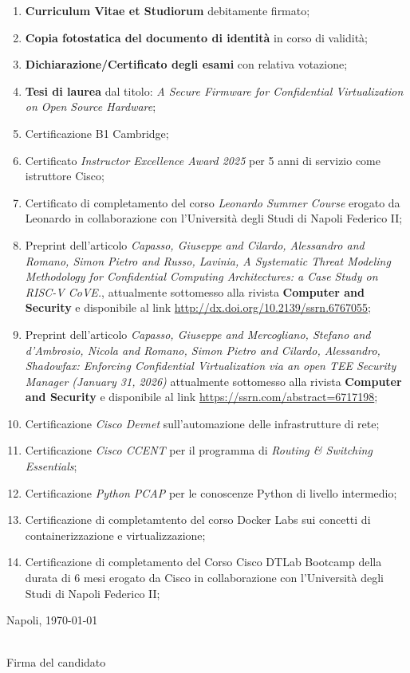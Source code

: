 \documentclass[11pt,a4paper]{article}
\begin{document}
\begin{enumerate}[label=\textbf{\arabic*.}]
    \item \textbf{Curriculum Vitae et Studiorum} debitamente firmato;
    \item \textbf{Copia fotostatica del documento di identità} in corso di validità;
    \item \textbf{Dichiarazione/Certificato degli esami} con relativa votazione;
    \item \textbf{Tesi di laurea} dal titolo: \textit{A Secure Firmware for Confidential Virtualization on Open Source Hardware};
    \item Certificazione B1 Cambridge;
    \item Certificato \textit{Instructor Excellence Award 2025} per 5 anni di servizio come istruttore Cisco;
    \item Certificato di completamento del corso \textit{Leonardo Summer Course} erogato da Leonardo in collaborazione con l'Università degli Studi di Napoli Federico II;
    \item Preprint dell'articolo \textit{Capasso, Giuseppe and Cilardo, Alessandro and Romano, Simon Pietro and Russo, Lavinia, A Systematic Threat Modeling Methodology for Confidential Computing Architectures: a Case Study on RISC-V CoVE.}, attualmente sottomesso alla rivista \textbf{Computer and Security} e disponibile al link \url{http://dx.doi.org/10.2139/ssrn.6767055};
    \item Preprint dell'articolo \textit{Capasso, Giuseppe and Mercogliano, Stefano and d’Ambrosio, Nicola and Romano, Simon Pietro and Cilardo, Alessandro, Shadowfax: Enforcing Confidential Virtualization via an open TEE Security Manager (January 31, 2026)} attualmente sottomesso alla rivista \textbf{Computer and Security} e disponibile al link \url{https://ssrn.com/abstract=6717198};
    \item Certificazione \textit{Cisco Devnet} sull'automazione delle infrastrutture di rete;
\item Certificazione \textit{Cisco CCENT} per il programma di \textit{Routing \& Switching Essentials};
    \item Certificazione \textit{Python PCAP} per le conoscenze Python di livello intermedio;
    \item Certificazione di completamtento del corso Docker Labs sui concetti di containerizzazione e virtualizzazione;
    \item Certificazione di completamento del Corso Cisco DTLab Bootcamp della durata di $6$ mesi erogato da Cisco in collaborazione con l'Università degli Studi di Napoli Federico II;
\end{enumerate}

\vspace{1.5cm}

\noindent
Napoli, \today

\vspace{1cm}

\begin{flushright}
    \makebox[5cm]{\hrulefill} \\
    \vspace{1mm}
    \small{Firma del candidato}
\end{flushright}
\end{document}
